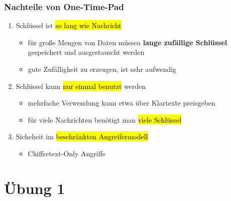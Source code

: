 \documentclass[a4paper, 10pt]{article}
\begin{document}
\subsubsection{Nachteile von One-Time-Pad}
\begin{enumerate}
    \item Schlüssel ist \hl{so lang wie Nachricht}
    \begin{itemize}
        \item für große Mengen von Daten müssen \textbf{lange zufällige Schlüssel} gespeichert und ausgestauscht werden
        \item gute Zufälligkeit zu erzeugen, ist sehr aufwendig
    \end{itemize}


    \item Schlüssel kann \hl{nur einmal benutzt} werden
    \begin{itemize}
        \item mehrfache Verwendung kann etwa über Klartexte preisgeben
        \item für viele Nachrichten benötigt man \hl{viele Schlüssel}
    \end{itemize}


    \item Sicheheit im \hl{beschränkten Angreifermodell}
    \begin{itemize}
        \item Chiffretext-Only Angriffe
    \end{itemize}
\end{enumerate}
\section{Übung 1}
\end{document}
